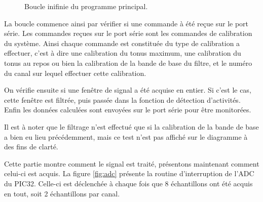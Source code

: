\documentclass[letterpaper, twoside, 12pt, memoire, creativecommons, hyperref]{thETS}
\begin{document}
\begin{figure}
	\centering
	\caption{Boucle inifinie du programme principal.}
	\label{fig:mainloop}
\end{figure}

La boucle commence ainsi par vérifier si une commande à été reçue sur le port série. Les commandes reçues sur le port série sont les commandes de calibration du système. Ainsi chaque commande est constituée du type de calibration a effectuer, c'est à dire une calibration du tonus maximum, une calibration du tonus au repos ou bien la calibration de la bande de base du filtre, et le numéro du canal sur lequel effectuer cette calibration. 

On vérifie ensuite si une fenêtre de signal a été acquise en entier. Si c'est le cas, cette fenêtre est filtrée, puis passée dans la fonction de détection d'activités. Enfin les données calculées sont envoyées sur le port série pour être monitorées.

Il est à noter que le filtrage n'est effectué que si la calibration de la bande de base a bien eu lieu précédemment, mais ce test n'est pas affiché sur le diagramme à des fins de clarté. 

Cette partie montre comment le signal est traité, présentons maintenant comment celui-ci est acquis. La figure \ref{fig:adc} présente la routine d'interruption de l'ADC du PIC32. Celle-ci est déclenchée à chaque fois que 8 échantillons ont été acquis en tout, soit 2 échantillons par canal. 
\end{document}
